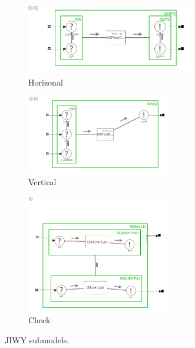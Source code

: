 \documentclass[a4paper,twoside,11pt]{article}
\begin{document}
\begin{figure}[h]
	\begin{subfigure}{\textwidth}
		\centering
		\includegraphics[width=0.8\textwidth]{./img/jiwy-jiwy-hor.png}
		\caption{Horizonal}
	\end{subfigure}
	\begin{subfigure}{\textwidth}
		\centering
		\includegraphics[width=0.7\textwidth]{./img/jiwy-jiwy-ver.png}
		\caption{Vertical}
	\end{subfigure}
	\begin{subfigure}{\textwidth}
		\centering
		\includegraphics[width=0.7\textwidth]{./img/jiwy-jiwy-check.png}
		\caption{Check}
	\end{subfigure}
	\caption{JIWY submodels.}
	\label{fig:jiwysubmodel}
\end{figure}
\end{document}
